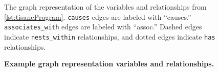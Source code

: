 {\begin{figure}[h]
%
%
%
        \caption{\textbf{Example graph representation variables and relationships.}}
            \begin{small}
            \begin{minipage}{\linewidth}
                The graph representation of the variables and relationships from \autoref{lst:tisaneProgram}. 
                \texttt{causes} edges are labeled with ``causes.'' \texttt{associates\_with} edges are labeled with ``assoc.'' Dashed edges indicate \texttt{nests\_within} relationships, and dotted edges indicate \texttt{has} relationships.
            \end{minipage}

\end{small}
\end{figure}}
